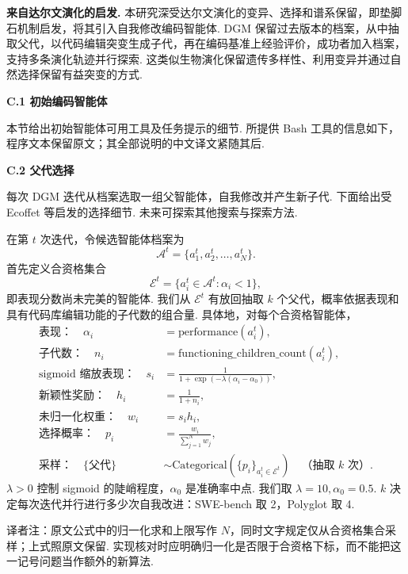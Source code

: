 \textbf{来自达尔文演化的启发.} 本研究深受达尔文演化\cite{dgm-darwin2023origin}的变异、选择和谱系保留，即垫脚石机制启发，将其引入自我修改编码智能体. DGM 保留过去版本的档案，从中抽取父代，以代码编辑突变生成子代，再在编码基准上经验评价，成功者加入档案，支持多条演化轨迹并行探索. 这类似生物演化\cite{dgm-edwards2000genetical,dgm-wright1932roles}保留遗传多样性\cite{dgm-mayr1982growth}、利用变异\cite{dgm-kimura1979neutral}并通过自然选择保留有益突变\cite{dgm-dobzhansky1970genetics}的方式.

\noindent\textbf{C.1 初始编码智能体}\label{dgm-app:initial-agent}\par
本节给出初始智能体可用工具及任务提示的细节. 所提供 Bash 工具的信息如下，程序文本保留原文；其全部说明的中文译文紧随其后.


\noindent\textbf{C.2 父代选择}\label{dgm-app:parent-select}\par
每次 DGM 迭代从档案选取一组父智能体，自我修改并产生新子代. 下面给出受 Ecoffet 等\cite{dgm-ecoffet2019go}启发的选择细节. 未来可探索其他搜索与探索方法\cite{dgm-coulom2006efficient,dgm-silver2016mastering,dgm-herr2025llm}.

在第 $t$ 次迭代，令候选智能体档案为
\[\mathcal A^t=\{a_1^t,a_2^t,\ldots,a_N^t\}.\label{dgm-equation-archive}\]
首先定义合资格集合
\[\mathcal E^t=\{a_i^t\in\mathcal A^t:\alpha_i<1\},\label{dgm-equation-eligible}\]
即表现分数尚未完美的智能体. 我们从 $\mathcal E^t$ 有放回抽取 $k$ 个父代，概率依据表现和具有代码库编辑功能的子代数的组合量. 具体地，对每个合资格智能体，
\begin{align}
\text{表现：}\quad\alpha_i&=\mathrm{performance}(a_i^t),\label{dgm-equation-1}\\
\text{子代数：}\quad n_i&=\mathrm{functioning\_children\_count}(a_i^t),\label{dgm-equation-2}\\
\text{sigmoid 缩放表现：}\quad s_i&=\frac1{1+\exp(-\lambda(\alpha_i-\alpha_0))},\label{dgm-equation-3}\\
\text{新颖性奖励：}\quad h_i&=\frac1{1+n_i},\label{dgm-equation-4}\\
\text{未归一化权重：}\quad w_i&=s_i h_i,\label{dgm-equation-5}\\
\text{选择概率：}\quad p_i&=\frac{w_i}{\sum_{j=1}^{N}w_j},\label{dgm-equation-6}\\
\text{采样：}\quad\{\text{父代}\}&\sim\mathrm{Categorical}(\{p_i\}_{a_i^t\in\mathcal E^t})
\quad\text{（抽取 $k$ 次）}.\label{dgm-equation-7}
\end{align}
$\lambda>0$ 控制 sigmoid 的陡峭程度，$\alpha_0$ 是准确率中点. 我们取 $\lambda=10,\alpha_0=0.5$. $k$ 决定每次迭代并行进行多少次自我改进：SWE-bench 取 2，Polyglot 取 4.
\begin{remark}
译者注：原文公式中的归一化求和上限写作 $N$，同时文字规定仅从合资格集合采样；上式照原文保留. 实现核对时应明确归一化是否限于合资格下标，而不能把这一记号问题当作额外的新算法.
\end{remark}

